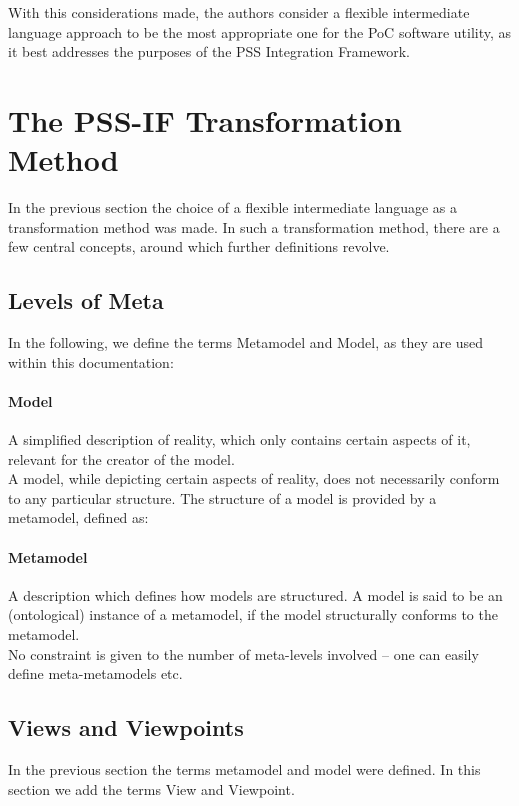 With this considerations made, the authors consider a flexible intermediate language approach to be the most appropriate one for the PoC software utility, as it best addresses the purposes of the PSS Integration Framework.

\section{The PSS-IF Transformation Method}
\label{sec:approach:pssif}

In the previous section the choice of a flexible intermediate language as a transformation method was made. In such a transformation method, there are a few central concepts, around which further definitions revolve.

\subsection{Levels of Meta}

In the following, we define the terms Metamodel and Model, as they are used within this documentation:

\paragraph{Model} A simplified description of reality, which only contains certain aspects of it, relevant for the creator of the model.\\

A model, while depicting certain aspects of reality, does not necessarily conform to any particular structure. The structure of a model is provided by a metamodel, defined as:

\paragraph{Metamodel} A description which defines how models are structured. A model is said to be an (ontological) instance of a metamodel, if the model structurally conforms to the metamodel.\\

No constraint is given to the number of meta-levels involved -- one can easily define meta-metamodels etc.

\subsection{Views and Viewpoints}

In the previous section the terms metamodel and model were defined. In this section we add the terms View and Viewpoint.

